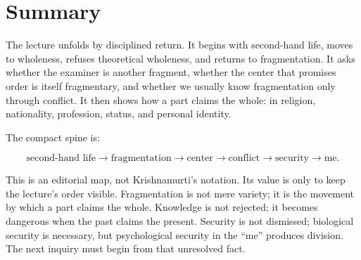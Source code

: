 \section{Summary}

The lecture unfolds by disciplined return. It begins with second-hand life, moves to wholeness, refuses theoretical wholeness, and returns to fragmentation. It asks whether the examiner is another fragment, whether the center that promises order is itself fragmentary, and whether we usually know fragmentation only through conflict. It then shows how a part claims the whole: in religion, nationality, profession, status, and personal identity.

The compact spine is:

\begin{equation}
\text{second-hand life}
\longrightarrow
\text{fragmentation}
\longrightarrow
\text{center}
\longrightarrow
\text{conflict}
\longrightarrow
\text{security}
\longrightarrow
\text{me}.
\end{equation}

This is an editorial map, not Krishnamurti's notation. Its value is only to keep the lecture's order visible. Fragmentation is not mere variety; it is the movement by which a part claims the whole. Knowledge is not rejected; it becomes dangerous when the past claims the present. Security is not dismissed; biological security is necessary, but psychological security in the ``me'' produces division. The next inquiry must begin from that unresolved fact.